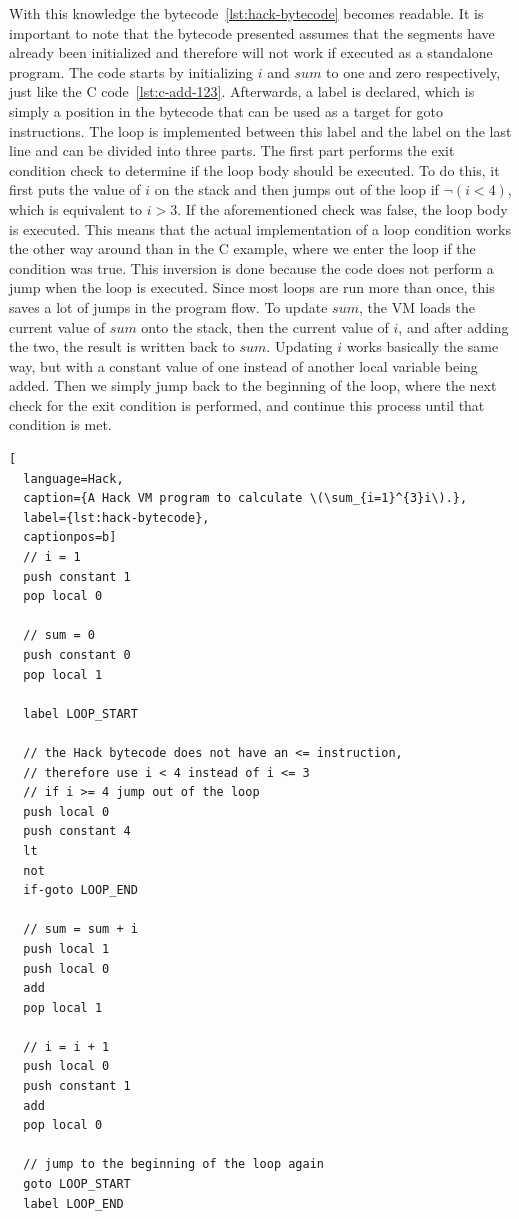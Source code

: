 With this knowledge the bytecode~\ref{lst:hack-bytecode} becomes readable.
It is important to note that the bytecode presented assumes that the segments have already been initialized and therefore will not work if executed as a standalone program.
The code starts by initializing \(i\) and \(sum\) to one and zero respectively, just like the C code~\ref{lst:c-add-123}.
Afterwards, a label is declared, which is simply a position in the bytecode that can be used as a target for goto instructions.
The loop is implemented between this label and the label on the last line and can be divided into three parts.
The first part performs the exit condition check to determine if the loop body should be executed.
To do this, it first puts the value of \(i\) on the stack and then jumps out of the loop if \(\neg(i < 4)\), which is equivalent to \(i > 3\).
If the aforementioned check was false, the loop body is executed.
This means that the actual implementation of a loop condition works the other way around than in the C example, where we enter the loop if the condition was true.
This inversion is done because the code does not perform a jump when the loop is executed.
Since most loops are run more than once, this saves a lot of jumps in the program flow.
To update \(sum\), the VM loads the current value of \(sum\) onto the stack, then the current value of \(i\), and after adding the two, the result is written back to \(sum\).
Updating \(i\) works basically the same way, but with a constant value of one instead of another local variable being added.
Then we simply jump back to the beginning of the loop, where the next check for the exit condition is performed, and continue this process until that condition is met.

\begin{lstlisting}[
  language=Hack,
  caption={A Hack VM program to calculate \(\sum_{i=1}^{3}i\).},
  label={lst:hack-bytecode},
  captionpos=b]
  // i = 1
  push constant 1
  pop local 0

  // sum = 0
  push constant 0
  pop local 1

  label LOOP_START

  // the Hack bytecode does not have an <= instruction,
  // therefore use i < 4 instead of i <= 3
  // if i >= 4 jump out of the loop
  push local 0
  push constant 4
  lt
  not
  if-goto LOOP_END

  // sum = sum + i
  push local 1
  push local 0
  add
  pop local 1

  // i = i + 1
  push local 0
  push constant 1
  add
  pop local 0

  // jump to the beginning of the loop again
  goto LOOP_START
  label LOOP_END
\end{lstlisting}

